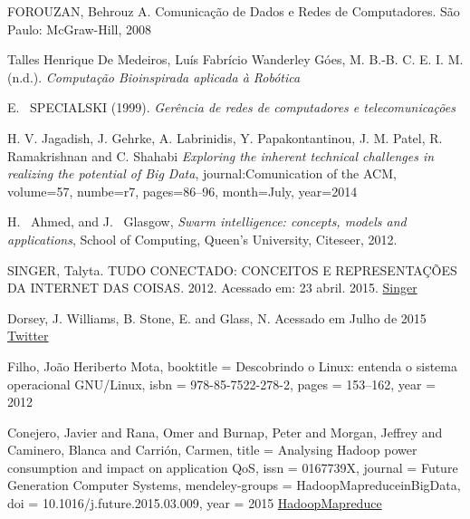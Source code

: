\documentclass[conference,compsoc]{IEEEtran}
\begin{document}
%
%
%
\begin{thebibliography}{1}

FOROUZAN, Behrouz A. Comunicação de Dados e Redes de Computadores. São Paulo: McGraw-Hill, 2008

Talles Henrique De Medeiros, Luís Fabrício Wanderley Góes, M. B.-B. C. E. I. M. (n.d.). 
\emph{Computação Bioinspirada aplicada à Robótica}

E. ~SPECIALSKI (1999).
\emph{Gerência de redes de computadores e telecomunicações}

  H. V. Jagadish, J. Gehrke, A. Labrinidis, Y. Papakontantinou, J. M. Patel, R. Ramakrishnan and C. Shahabi
  \emph{Exploring the inherent technical challenges in realizing the potential of Big Data},
  journal:Comunication of the ACM, volume=57, numbe=r7, pages=86--96, month=July, year=2014

H. ~Ahmed, and J. ~Glasgow,
\emph{Swarm intelligence: concepts, models and applications},
\relax School of Computing, Queen's University, Citeseer, 2012.

SINGER, Talyta. TUDO CONECTADO: CONCEITOS E REPRESENTAÇÕES DA INTERNET DAS COISAS. 2012.
Acessado em: 23 abril. 2015.
\href{http://www.simsocial2012.ufba.br/modulos/submissao/Upload/44965.pdf} {Singer}

Dorsey, J. Williams, B. Stone, E. and Glass, N.
Acessado em Julho de 2015
\href {https://pt.wikipedia.org/wiki/Twitter}
{Twitter}

Filho, João Heriberto Mota,
booktitle = {Descobrindo o Linux: entenda o sistema operacional GNU/Linux},
isbn = {978-85-7522-278-2},
pages = {153--162},
year = {2012}

Conejero, Javier and Rana, Omer and Burnap, Peter and Morgan, Jeffrey and Caminero, Blanca and Carri{\'{o}}n, Carmen,
title = {{Analysing Hadoop power consumption and impact on application QoS}},
issn = {0167739X},
journal = {Future Generation Computer Systems},
mendeley-groups = {HadoopMapreduceinBigData},
doi = {10.1016/j.future.2015.03.009},
year = {2015}
\href{http://linkinghub.elsevier.com/retrieve/pii/S0167739X15000643}{HadoopMapreduce}



\end{thebibliography}
\end{document}
